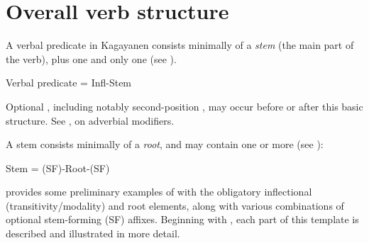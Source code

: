 \section{Overall verb structure}

\label{bkm:Ref62720957}
A verbal predicate in Kagayanen consists minimally of a \textit{stem} (the main part of the verb), plus one and only one  (see ).


\ea
Verbal predicate = Infl-Stem
\z

Optional , including notably second-position , may occur before or after this basic structure. See ,  on adverbial modifiers.

\hspace*{-1.5pt}A  stem consists minimally of a \textit{root}, and may contain one or more  (see ):

\ea
Stem = (SF)-Root-(SF)
\z

 provides some preliminary examples of  with the obligatory  inflectional (transitivity/modality) and root elements, along with various combinations of optional  stem-forming (SF) affixes. Beginning with , each part of this template is described and illustrated in more detail.


